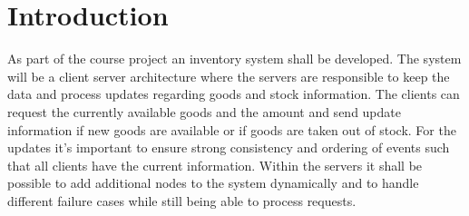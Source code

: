 
\chapter{Introduction} \label{ch:Introduction}
As part of the course project an inventory system shall be developed. The system will be a client server architecture where the servers are responsible to keep the data and process updates regarding goods and stock information. The clients can request the currently available goods and the amount and send update information if new goods are available or if goods are taken out of stock. For the updates it’s important to ensure strong consistency and ordering of events such that all clients have the current information. Within the servers it shall be possible to add additional nodes to the system dynamically and to handle different failure cases while still being able to process requests.
